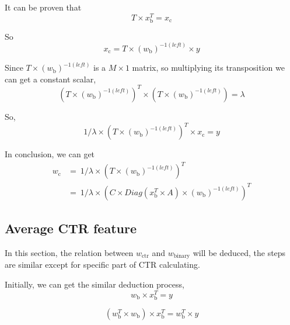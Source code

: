 It can be proven that 
\begin{equation}
T \times x_{\text{b}}^T =  x_{\text{c}}
\end{equation}

So
\begin{equation}
x_{\text{c}} =  T \times (w_{\text{b}})^{-1(left)} \times y 
\end{equation}

Since \(T \times (w_{\text{b}})^{-1(left)}\) is a \(M \times 1\) matrix, so multiplying its transposition we can get a constant scalar, 
\begin{equation}
(T \times (w_{\text{b}})^{-1(left)})^T \times (T \times (w_{\text{b}})^{-1(left)}) = \lambda
\end{equation}

So, 
\begin{equation}
1/{\lambda} \times (T \times (w_{\text{b}})^{-1(left)})^T \times x_{\text{c}} =  y
\end{equation}

In conclusion, we can get
\begin{equation} \label{eq:12}
\begin{split}
w_{\text{c}} & =\ 1/{\lambda} \times (T \times (w_{\text{b}})^{-1(left)})^T \\
& = \ 1/{\lambda} \times (C \times Diag(x_{\text{b}}^T \times A) \times (w_{\text{b}})^{-1(left)})^T
\end{split}
\end{equation}

\subsection{Average CTR feature}

\setlength{\parindent}{5ex}

In this section, the relation between  \(w_{\text{ctr}}\) and \(w_{\text{binary}}\) will be deduced, the steps are similar except for specific part of CTR calculating. \vspace{3mm}

Initially, we can get the similar deduction process, 
\begin{equation}
w_{\text{b}} \times x_{\text{b}}^T = y 
\end{equation}

\begin{equation}
(w_{\text{b}}^T \times w_{\text{b}}) \times x_{\text{b}}^T = w_{\text{b}}^T \times y 
\end{equation}

